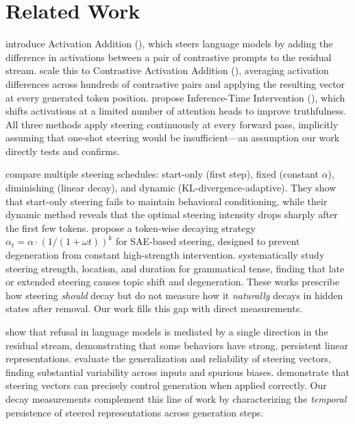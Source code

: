 \section{Related Work}
\label{sec:related}

\citet{turner2023steering} introduce Activation Addition (\actadd), which steers language models by adding the difference in activations between a pair of contrastive prompts to the residual stream. \citet{rimsky2024steering} scale this to Contrastive Activation Addition (\caa), averaging activation differences across hundreds of contrastive pairs and applying the resulting vector at every generated token position. \citet{li2023inference} propose Inference-Time Intervention (\iti), which shifts activations at a limited number of attention heads to improve truthfulness. All three methods apply steering continuously at every forward pass, implicitly assuming that one-shot steering would be insufficient---an assumption our work directly tests and confirms.

\citet{scalena2024dynamic} compare multiple steering schedules: start-only (first step), fixed (constant $\alpha$), diminishing (linear decay), and dynamic (KL-divergence-adaptive). They show that start-only steering fails to maintain behavioral conditioning, while their dynamic method reveals that the optimal steering intensity drops sharply after the first few tokens. \citet{xie2025comparative} propose a token-wise decaying strategy $\alpha_t = \alpha \cdot (1/(1 + \omega t))^k$ for SAE-based steering, designed to prevent degeneration from constant high-strength intervention. \citet{klerings2025steering} systematically study steering strength, location, and duration for grammatical tense, finding that late or extended steering causes topic shift and degeneration. These works prescribe how steering \emph{should} decay but do not measure how it \emph{naturally} decays in hidden states after removal. Our work fills this gap with direct measurements.

\citet{arditi2024refusal} show that refusal in language models is mediated by a single direction in the residual stream, demonstrating that some behaviors have strong, persistent linear representations. \citet{tan2024analyzing} evaluate the generalization and reliability of steering vectors, finding substantial variability across inputs and spurious biases. \citet{subramani2022extracting} demonstrate that steering vectors can precisely control generation when applied correctly. Our decay measurements complement this line of work by characterizing the \emph{temporal} persistence of steered representations across generation steps.

